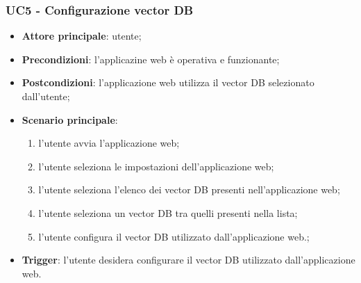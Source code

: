 \documentclass[10pt, a4paper]{article}
\begin{document}
    \subsubsection{UC5 - Configurazione vector DB}
    \begin{itemize}
        \item \textbf{Attore principale}: utente;
        \item \textbf{Precondizioni}: l'applicazine web è operativa e funzionante;
        \item \textbf{Postcondizioni}: l'applicazione web utilizza il vector DB selezionato dall'utente;
        \item \textbf{Scenario principale}:
            \begin{enumerate}
                \item l'utente avvia l'applicazione web;
                \item l'utente seleziona le impostazioni dell'applicazione web;
                \item l'utente seleziona l'elenco dei vector DB presenti nell'applicazione web;
                \item l'utente seleziona un vector DB tra quelli presenti nella lista;
                \item l'utente configura il vector DB utilizzato dall'applicazione web.;
            \end{enumerate}
        \item \textbf{Trigger}: l'utente desidera configurare il vector DB utilizzato dall'applicazione web.
    \end{itemize}
\end{document}
